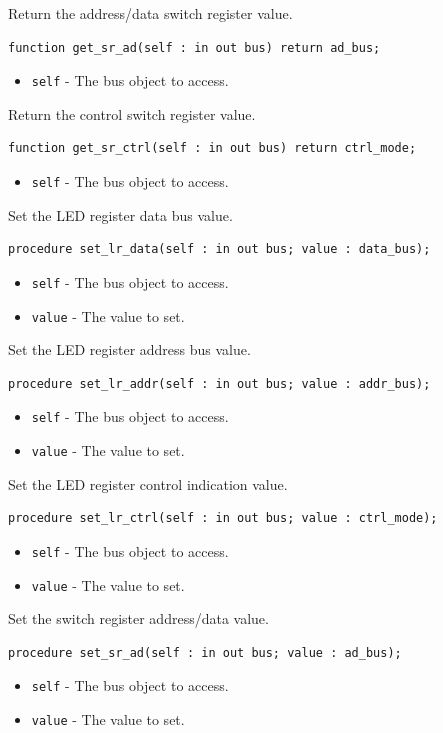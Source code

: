 \documentclass[10pt, openany]{book}
\newcommand{\keyword}[1]{\texttt{#1}}
\begin{document}
Return the address/data switch register value.
\begin{lstlisting}
function get_sr_ad(self : in out bus) return ad_bus;
\end{lstlisting}
\begin{itemize}
  \item \keyword{self} - The bus object to access.
\end{itemize}

Return the control switch register value.
\begin{lstlisting}
function get_sr_ctrl(self : in out bus) return ctrl_mode;
\end{lstlisting}
\begin{itemize}
  \item \keyword{self} - The bus object to access.
\end{itemize}

Set the LED register data bus value.
\begin{lstlisting}
procedure set_lr_data(self : in out bus; value : data_bus);
\end{lstlisting}
\begin{itemize}
  \item \keyword{self} - The bus object to access.
  \item \keyword{value} - The value to set.
\end{itemize}

Set the LED register address bus value.
\begin{lstlisting}
procedure set_lr_addr(self : in out bus; value : addr_bus);
\end{lstlisting}
\begin{itemize}
  \item \keyword{self} - The bus object to access.
  \item \keyword{value} - The value to set.
\end{itemize}

Set the LED register control indication value.
\begin{lstlisting}
procedure set_lr_ctrl(self : in out bus; value : ctrl_mode);
\end{lstlisting}
\begin{itemize}
  \item \keyword{self} - The bus object to access.
  \item \keyword{value} - The value to set.
\end{itemize}

Set the switch register address/data value.
\begin{lstlisting}
procedure set_sr_ad(self : in out bus; value : ad_bus);
\end{lstlisting}
\begin{itemize}
  \item \keyword{self} - The bus object to access.
  \item \keyword{value} - The value to set.
\end{itemize}
\end{document}
